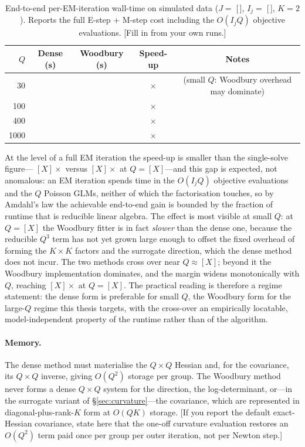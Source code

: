 \begin{table}[H]
\centering
\caption{End-to-end per-EM-iteration wall-time on simulated data
($J=\;$[\,], $I_j=\;$[\,], $K=2$). Reports the full E-step + M-step cost including
the $O(I_jQ)$ objective evaluations. [Fill in from your own runs.]}
\label{tab:endtoend-timing}
\begin{tabular}{@{}rcccc@{}}
\toprule
$Q$ & Dense (s) & Woodbury (s) & Speed-up & Notes \\
\midrule
30   &  &  & $\times$ & (small $Q$: Woodbury overhead may dominate) \\
100  &  &  & $\times$ & \\
400  &  &  & $\times$ & \\
1000 &  &  & $\times$ & \\
\bottomrule
\end{tabular}
\end{table}

At the level of a full EM iteration the speed-up is smaller than the single-solve figure---
$[X]\times$ versus $[X]\times$ at $Q=[X]$---and this gap is expected, not anomalous: an EM
iteration spends time in the $O(I_jQ)$ objective evaluations and the $Q$ Poisson GLMs, neither
of which the factorisation touches, so by Amdahl's law the achievable end-to-end gain is
bounded by the fraction of runtime that is reducible linear algebra. The effect is most
visible at small $Q$: at $Q=[X]$ the Woodbury fitter is in fact \emph{slower} than the dense
one, because the reducible $Q^3$ term has not yet grown large enough to offset the fixed
overhead of forming the $K\times K$ factors and the surrogate direction, which the dense
method does not incur. The two methods cross over near $Q\approx[X]$; beyond it the Woodbury
implementation dominates, and the margin widens monotonically with $Q$, reaching $[X]\times$
at $Q=[X]$. The practical reading is therefore a regime statement: the dense form is preferable
for small $Q$, the Woodbury form for the large-$Q$ regime this thesis targets, with the
cross-over an empirically locatable, model-independent property of the runtime rather than of
the algorithm.

\paragraph{Memory.}
The dense method must materialise the $Q\times Q$ Hessian and, for the covariance, its
$Q\times Q$ inverse, giving $O(Q^2)$ storage per group. The Woodbury method never forms a
dense $Q\times Q$ system for the direction, the log-determinant, or---in the surrogate variant
of \S\ref{sec:curvature}---the covariance, which are represented in diagonal-plus-rank-$K$ form
at $O(QK)$ storage. [If you report the default exact-Hessian covariance, state here that the
one-off curvature evaluation restores an $O(Q^2)$ term paid once per group per outer iteration,
not per Newton step.]

